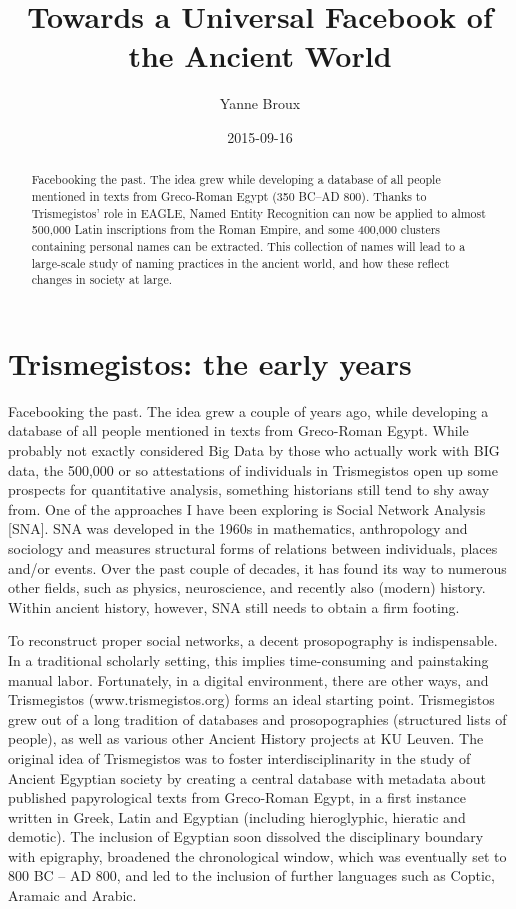 \documentclass[amsthm,ebook]{saparticle}
\title{Towards a Universal Facebook of the Ancient World}
\author[KU]{Yanne Broux\corref{first}}
\date{2015-09-16}
\begin{document}
\maketitle
\begin{abstract}
Facebooking the past. The idea grew while developing a database of all people mentioned in texts from Greco-Roman Egypt
(350 BC–AD 800). Thanks to Trismegistos' role in EAGLE, Named Entity Recognition can now be applied to almost 500,000
Latin inscriptions from the Roman Empire, and some 400,000 clusters containing personal names can be extracted. This
collection of names will lead to a large-scale study of naming practices in the ancient world, and how these reflect
changes in society at large.
\end{abstract}




\section{Trismegistos: the early years}


\noindent Facebooking the past. The idea grew a couple of years ago, while developing a database of all people mentioned in texts
from Greco-Roman Egypt. While probably not exactly considered Big Data by those who actually work with BIG data, the
500,000 or so attestations of individuals in Trismegistos open up some prospects for quantitative analysis, something
historians still tend to shy away from. One of the approaches I have been exploring is Social Network Analysis [SNA].
SNA was developed in the 1960s in mathematics, anthropology and sociology and measures structural forms of relations
between individuals, places and/or events. Over the past couple of decades, it has found its way to numerous other
fields, such as physics, neuroscience, and recently also (modern) history. Within ancient history, however, SNA still
needs to obtain a firm footing.

To reconstruct proper social networks, a decent prosopography is indispensable. In a traditional scholarly setting, this
implies time-consuming and painstaking manual labor. Fortunately, in a digital environment, there are other ways, and
Trismegistos (www.trismegistos.org) forms an ideal starting point. Trismegistos grew out of a long tradition of
databases and prosopographies (structured lists of people), as well as various other Ancient History projects at KU
Leuven. The original idea of Trismegistos was to foster interdisciplinarity in the study of Ancient Egyptian society by
creating a central database with metadata about published papyrological texts from Greco-Roman Egypt, in a first
instance written in Greek, Latin and Egyptian (including hieroglyphic, hieratic and demotic). The inclusion of Egyptian
soon dissolved the disciplinary boundary with epigraphy, broadened the chronological window, which was eventually set
to 800 BC – AD 800, and led to the inclusion of further languages such as Coptic, Aramaic and Arabic.
\end{document}
